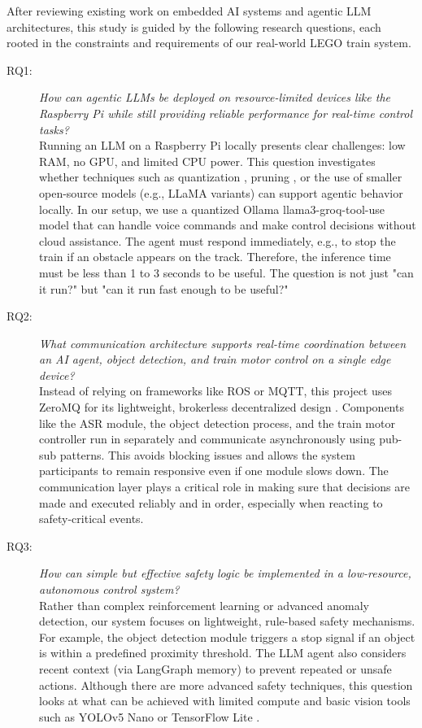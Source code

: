 After reviewing existing work on embedded AI systems and agentic LLM architectures, this study is guided by the following research questions, each rooted in the constraints and requirements of our real-world LEGO train system.
\begin{description}
    \item[RQ1:] \textit{How can agentic LLMs be deployed on resource-limited devices like the Raspberry Pi while still providing reliable performance for real-time control tasks?}\\
    
    Running an LLM on a Raspberry Pi locally presents clear challenges: low RAM, no GPU, and limited CPU power. This question investigates whether techniques such as quantization \cite{dettmers2022optimizers}, pruning \cite{han2016deep}, or the use of smaller open-source models (e.g., LLaMA variants) can support agentic behavior locally. In our setup, we use a quantized Ollama llama3-groq-tool-use model that can handle voice commands and make control decisions without cloud assistance. The agent must respond immediately, e.g., to stop the train if an obstacle appears on the track. Therefore, the inference time must be less than 1 to 3 seconds to be useful. The question is not just "can it run?" but "can it run fast enough to be useful?"
    
    \item[RQ2:] \textit{What communication architecture supports real-time coordination between an AI agent, object detection, and train motor control on a single edge device?} \\
    
    Instead of relying on frameworks like ROS or MQTT, this project uses ZeroMQ for its lightweight, brokerless decentralized design \cite{hintjens2013zeromq,zhang2021zeromqiot}. Components like the ASR module, the object detection process, and the train motor controller run in separately and communicate asynchronously using pub-sub patterns. This avoids blocking issues and allows the system participants to remain responsive even if one module slows down. The communication layer plays a critical role in making sure that decisions are made and executed reliably and in order, especially when reacting to safety-critical events.

    \item[RQ3:] \textit{How can simple but effective safety logic be implemented in a low-resource, autonomous control system?} \\
    
    Rather than complex reinforcement learning or advanced anomaly detection, our system focuses on lightweight, rule-based safety mechanisms. For example, the object detection module triggers a stop signal if an object is within a predefined proximity threshold. The LLM agent also considers recent context (via LangGraph memory) to prevent repeated or unsafe actions. Although there are more advanced safety techniques, this question looks at what can be achieved with limited compute and basic vision tools such as YOLOv5 Nano or TensorFlow Lite \cite{lin2022realtime,tan2023lightweightcv}.
\end{description}



